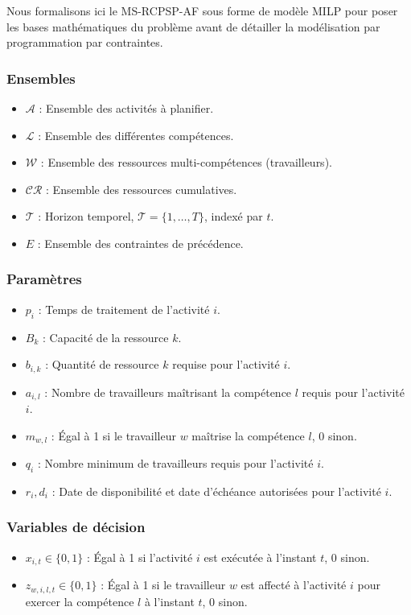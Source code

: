 Nous formalisons ici le MS-RCPSP-AF sous forme de modèle MILP pour poser les bases mathématiques du problème avant de détailler la modélisation par programmation par contraintes.


\subsubsection{Ensembles}
\begin{itemize}
    \item $\mathcal{A}$ : Ensemble des activités à planifier.
    \item $\mathcal{L}$ : Ensemble des différentes compétences.
    \item $\mathcal{W}$ : Ensemble des ressources multi-compétences (travailleurs).
    \item $\mathcal{CR}$ : Ensemble des ressources cumulatives.
    \item $\mathcal{T}$ : Horizon temporel, $\mathcal{T} = \{1, \dots, T\}$, indexé par $t$.
    \item $E$ : Ensemble des contraintes de précédence.
\end{itemize}

\subsubsection{Paramètres}
\begin{itemize}
    \item $p_i$ : Temps de traitement de l'activité $i$.
    \item $B_k$ : Capacité de la ressource $k$.
    \item $b_{i,k}$ : Quantité de ressource $k$ requise pour l'activité $i$.
    \item $a_{i,l}$ : Nombre de travailleurs maîtrisant la compétence $l$ requis pour l'activité $i$.
    \item $m_{w,l}$ : Égal à 1 si le travailleur $w$ maîtrise la compétence $l$, 0 sinon.
    \item $q_i$ : Nombre minimum de travailleurs requis pour l'activité $i$.
    \item $r_i, d_i$ : Date de disponibilité et date d'échéance autorisées pour l'activité $i$.
\end{itemize}

\subsubsection{Variables de décision}
\begin{itemize}
    \item $x_{i,t} \in \{0, 1\}$ : Égal à 1 si l'activité $i$ est exécutée à l'instant $t$, 0 sinon.
    \item $z_{w,i,l,t} \in \{0, 1\}$ : Égal à 1 si le travailleur $w$ est affecté à l'activité $i$ pour exercer la compétence $l$ à l'instant $t$, 0 sinon.
\end{itemize}

